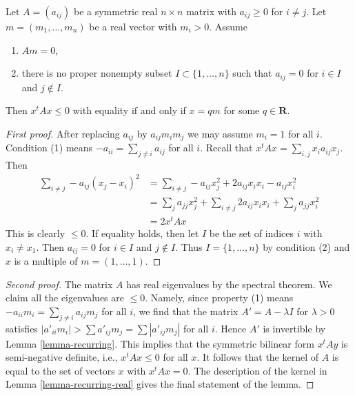 \begin{lemma}
\label{lemma-recurring-symmetric-real}
Let $A = (a_{ij})$ be a symmetric real $n \times n$ matrix with
$a_{ij} \geq 0$ for $i \not = j$.
Let $m = (m_1, \ldots, m_n)$ be a real vector with $m_i > 0$.
Assume
\begin{enumerate}
\item $Am = 0$,
\item there is no proper nonempty subset $I \subset \{1, \ldots, n\}$
such that $a_{ij} = 0$ for $i \in I$ and $j \not \in I$.
\end{enumerate}
Then $x^t A x \leq 0$ with equality if and only if $x = qm$
for some $q \in \mathbf{R}$.
\end{lemma}

\begin{proof}[First proof]
After replacing $a_{ij}$ by $a_{ij}m_im_j$ we may assume $m_i = 1$
for all $i$. Condition (1) means $-a_{ii} = \sum_{j \not = i} a_{ij}$
for all $i$. Recall that $x^tAx = \sum_{i, j} x_ia_{ij}x_j$.
Then
\begin{align*}
\sum\nolimits_{i \not = j} -a_{ij}(x_j - x_i)^2 & =
\sum\nolimits_{i \not = j} -a_{ij}x_j^2 + 2a_{ij}x_ix_i - a_{ij}x_i^2 \\
& =
\sum\nolimits_j a_{jj} x_j^2 +
\sum\nolimits_{i \not = j} 2a_{ij}x_ix_i +
\sum\nolimits_j a_{jj} x_i^2 \\
& = 2x^tAx
\end{align*}
This is clearly $\leq 0$. If equality holds, then let $I$ be the set
of indices $i$ with $x_i \not = x_1$. Then $a_{ij} = 0$ for $i \in I$
and $j \not \in I$. Thus $I = \{1, \ldots, n\}$ by condition (2) and
$x$ is a multiple of $m = (1, \ldots, 1)$.
\end{proof}

\begin{proof}[Second proof]
The matrix $A$ has real eigenvalues by the spectral theorem.
We claim all the eigenvalues are $\leq 0$.
Namely, since property (1) means
$-a_{ii}m_i = \sum_{j \not = i} a_{ij}m_j$ for all $i$,
we find that the matrix $A' = A - \lambda I$ for $\lambda > 0$
satisfies $|a'_{ii}m_i| > \sum a'_{ij}m_j = \sum |a'_{ij}m_j|$ for all $i$.
Hence $A'$ is invertible by Lemma \ref{lemma-recurring}.
This implies that the symmetric bilinear form $x^tAy$
is semi-negative definite, i.e., $x^tAx \leq 0$ for all $x$.
It follows that the kernel of $A$ is equal
to the set of vectors $x$ with $x^tAx = 0$.
The description of the kernel in Lemma \ref{lemma-recurring-real}
gives the final statement of the lemma.
\end{proof}

